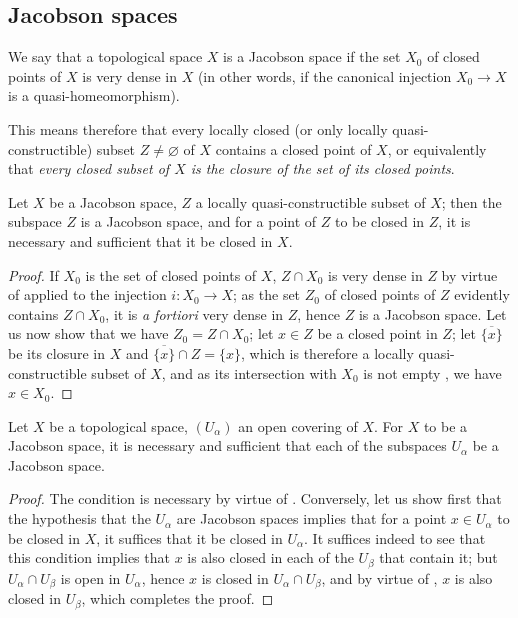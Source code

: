 \subsection{Jacobson spaces}
\label{subsection:IV.10.3}


\begin{definition}[10.3.1]
\label{IV.10.3.1}
We say that a topological space $X$ is a Jacobson space if the set $X_0$ of closed points of $X$ is very dense in $X$ (in other words, if the canonical injection $X_0\to X$ is a quasi-homeomorphism).
\end{definition}

This means therefore  that every locally closed (or only locally quasi-constructible) subset $Z\neq\varnothing$ of $X$ contains a closed point of $X$, or equivalently that \emph{every closed subset of $X$ is the closure of the set of its closed points}.

\begin{proposition}[10.3.2]
\label{IV.10.3.2}
Let $X$ be a Jacobson space, $Z$ a locally quasi-constructible subset of $X$; then the subspace $Z$ is a Jacobson space, and for a point of $Z$ to be closed in $Z$, it is necessary and sufficient that it be closed in $X$.
\end{proposition}

\begin{proof}
If $X_0$ is the set of closed points of $X$, $Z\cap X_0$ is very dense in $Z$ by virtue of  applied to the injection $i:X_0\to X$; as the set $Z_0$ of closed points of $Z$ evidently contains $Z\cap X_0$, it is \emph{a fortiori} very dense in $Z$, hence $Z$ is a Jacobson space.
Let us now show that we have $Z_0=Z\cap X_0$; let $x\in Z$ be a closed point in $Z$; let $\overline{\{x\}}$ be its closure in $X$ and $\overline{\{x\}}\cap Z=\{x\}$, which is therefore a locally quasi-constructible subset of $X$, and as its intersection with $X_0$ is not empty , we have $x\in X_0$.
\end{proof}

\begin{proposition}[10.3.3]
\label{IV.10.3.3}
Let $X$ be a topological space, $(U_\alpha)$ an open covering of $X$.
For $X$ to be a Jacobson space, it is necessary and sufficient that each of the subspaces $U_\alpha$ be a Jacobson space.
\end{proposition}

\begin{proof}
The condition is necessary by virtue of .
Conversely, let us show first that the hypothesis that the $U_\alpha$ are Jacobson spaces implies that for a point $x\in U_\alpha$ to be closed in $X$, it suffices that it be closed in $U_\alpha$.
It suffices indeed to see that this condition implies that $x$ is also closed in each of the $U_\beta$ that contain it; but $U_\alpha\cap U_\beta$ is open in $U_\alpha$, hence $x$ is closed in $U_\alpha\cap U_\beta$, and by virtue of , $x$ is also closed in $U_\beta$, which completes the proof.
\end{proof}

